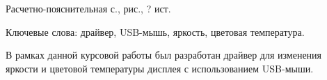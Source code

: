 
Расчетно-пояснительная \pageref{TotPages} с., \totalfigures{} рис., ? ист.

Ключевые слова: драйвер, USB-мышь, яркость, цветовая температура.

В рамках данной курсовой работы был разработан драйвер для изменения яркости и цветовой температуры дисплея с использованием USB-мыши.
